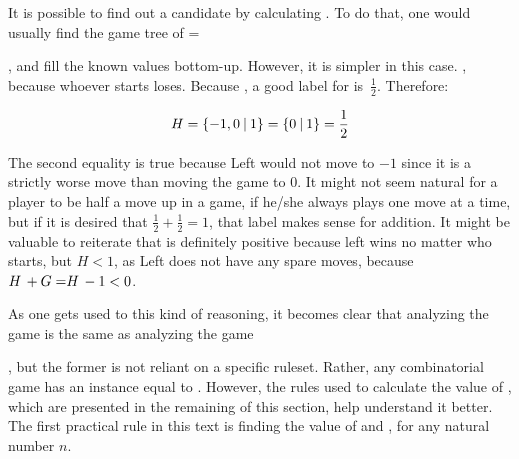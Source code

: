 It is possible to find out a candidate by calculating \Gm{ + \Hm + \Hm}. To do that, one would usually find the game tree of 
\Gm{ + \Hm + \Hm} = 
, and fill the known values bottom-up. However, it is simpler in this case. , because whoever starts loses. Because , a good label for \Hm is~$\frac{1}{2}$. Therefore:

$$H = \mbox{$\{{-}1, 0\:|\:1\}$} = \mbox{$\{0\:|\:1\}$} = \frac{1}{2}$$

 The second equality is true because Left would not move to $-1$ since it is a strictly worse move than moving the game to $0$. It might not seem natural for a player to be half a move up in a game, if he/she always plays one move at a time, but if it is desired that $\frac{1}{2} + \frac{1}{2} = 1$, that label makes sense for addition. It might be valuable to reiterate that \Hm is definitely positive because left wins no matter who starts, but $H < 1$, as Left does not have any spare moves, because $\mbox{$H\,$} + \mbox{$G=$} \mbox{$H\,$} - 1 < 0$.

As one gets used to this kind of reasoning, it becomes clear that analyzing the game  is the same as analyzing the game 
, but the former is not reliant on a specific ruleset. Rather, any combinatorial game has an instance equal to . However, the rules used to calculate the value of , which are presented in the remaining of this section, help understand it better. The first practical rule in this text is finding the value of  and , for any natural number $n$.


